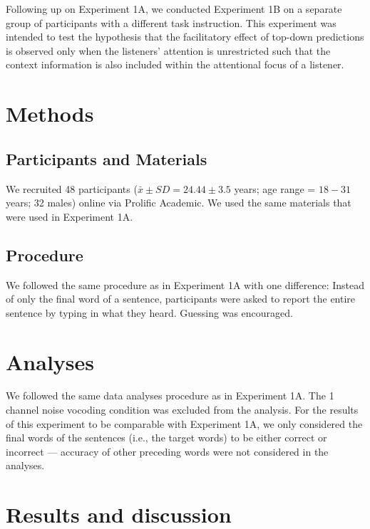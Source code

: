 \documentclass[a4paper, nobind]{templates/ociamthesis}
\begin{document}
Following up on Experiment 1A, we conducted Experiment 1B on a separate group of participants with a different task instruction.
This experiment was intended to test the hypothesis that the facilitatory effect of top-down predictions is observed only when the listeners' attention is unrestricted such that the context information is also included within the attentional focus of a listener.

\hypertarget{methods-1}{%
\section{Methods}\label{methods-1}}

\hypertarget{participants-and-materials}{%
\subsection{Participants and Materials}\label{participants-and-materials}}

We recruited 48 participants (\(\bar{x}\pm SD = 24.44 \pm 3.5\) years; age range = \(18-31\) years; 32 males) online via Prolific Academic.
We used the same materials that were used in Experiment 1A.

\hypertarget{procedure-1}{%
\subsection{Procedure}\label{procedure-1}}

We followed the same procedure as in Experiment 1A with one difference:
Instead of only the final word of a sentence, participants were asked to report the entire sentence by typing in what they heard.
Guessing was encouraged.

\hypertarget{analyses-1}{%
\section{Analyses}\label{analyses-1}}

We followed the same data analyses procedure as in Experiment 1A.
The 1 channel noise vocoding condition was excluded from the analysis.
For the results of this experiment to be comparable with Experiment 1A,
we only considered the final words of the sentences (i.e., the target words) to be either correct or incorrect ---
accuracy of other preceding words were not considered in the analyses.

\hypertarget{results-and-discussion-1}{%
\section{Results and discussion}\label{results-and-discussion-1}}
\end{document}

